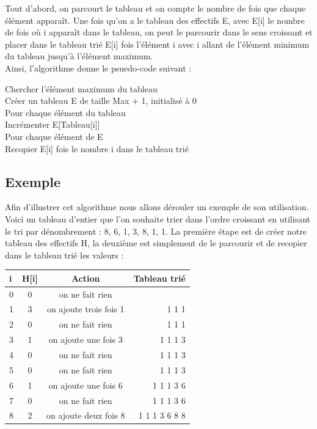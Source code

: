 \documentclass[12pt]{article}
\begin{document}
Tout d'abord, on parcourt le tableau et on compte le nombre de fois que chaque élément apparaît. Une fois qu’on a le tableau des effectifs E, avec E[i] le nombre de fois où i apparaît dans le tableau, on peut le parcourir dans le sens croissant et placer dans le tableau trié E[i] fois l’élément i avec i allant de l’élément minimum du tableau jusqu’à l’élément maximum.\\


Ainsi, l'algorithme donne le psuedo-code suivant : \\

\begin{tcolorbox}
Chercher l'élément maximum du tableau \\
 Créer un tableau E de taille Max + 1, initialisé à 0\\

Pour chaque élément du tableau\\
\hspace*{1.0 cm} Incrémenter E[Tableau[i]]\\

Pour chaque élément de E\\
\hspace*{1.0 cm}   Recopier E[i] fois le nombre i dans le tableau trié
\end{tcolorbox}


\newpage
\subsection{Exemple}
\hspace{1.0 cm} Afin d'illustrer cet algorithme nous allons dérouler un exemple de son utilisation.
Voici un tableau d’entier que l’on souhaite trier dans l’ordre croissant en utilisant le tri par dénombrement : 8, 6, 1, 3, 8, 1, 1.
La première étape est de créer notre tableau des effectifs H, la deuxième est simplement de le parcourir et de recopier dans le tableau trié les valeurs : 

\vspace{0.5 cm}
\hspace{3.0 cm}
\begin{tabular}{|l|c|c|r|}
  \hline
  i & H[i]  & Action & Tableau trié \\
  \hline
  0 &	0 &	on ne fait rien &\\
  1 &	3 &	on ajoute trois fois 1 &	1 1 1\\
  2 &	0 &	on ne fait rien &	1 1 1\\
  3 &	1 &	on ajoute une fois 3 &	1 1 1 3\\
  4 &	0& 	on ne fait rien &	1 1 1 3\\
5 &	0 &	on ne fait rien &	1 1 1 3\\
6 &	1 &	on ajoute une fois 6 &	1 1 1 3 6\\
7 &	0 &	on ne fait rien  &	1 1 1 3 6\\
8 &	2& 	on ajoute deux fois 8 &	1 1 1 3 6 8 8\\
  \hline
\end{tabular}
\end{document}
